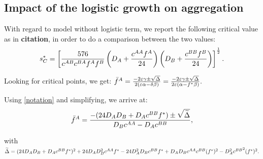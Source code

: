 \subsection{Impact of the logistic growth on aggregation}

With regard to model without logistic term, we report the following critical value as in \textbf{citation}, in order to do a comparison between the two values:
\begin{equation}
 {s^{*}_{C}}= \left[\frac{576}{{c^{AB}} {c^{BA}} {f^{A}} {f^{B}}} \left( D_A+\frac{{c^{AA}}{f^{A}}}{24} \right) \left(D_B+\frac{{c^{BB}}{f^{B}}}{24} \right) \right]^{\frac{1}{2}}. 
\end{equation}

%              
% 
Looking for critical points, we get:
${\bar{f}^A}= \frac{-2\varepsilon {\gamma} \pm \sqrt{\Delta}}{2(\varepsilon {\alpha}-{\delta}{\beta})}=\frac{-2\varepsilon {\gamma} \pm \sqrt{\Delta}}{2\varepsilon ({\alpha}-{f^{*}}{\beta})}.$

 Using \eqref{notation} and simplifying, we arrive at: 
\begin{equation}
{\bar{f}^A}=\frac{-(24 D_AD_B+D_A{c^{BB}}{f^{*}}) \pm \sqrt{\widetilde{\Delta}}}{D_B{c^{AA}}-D_A{c^{BB}}}, 
\end{equation}

with $\widetilde{\Delta}=(24D_AD_B+D_A{c^{BB}} {f^{*}})^2+24D_AD_B^{2}{c^{AA}}{f^{*}}-24D_A^2D_B{c^{BB}}{f^{*}}+D_A D_B {c^{AA}} {c^{BB}}({f^{*}})^{2}-D_A^{2} {c^{BB}}^2 ({f^{*}})^2.  $

